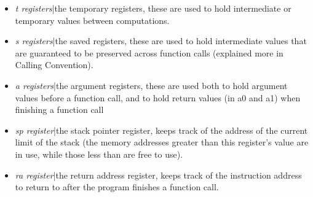 \documentclass{article}
\begin{document}
\begin{itemize}
\item \textit{t registers}|the temporary registers, these are used to hold intermediate or temporary values between computations.
\item \textit{s registers}|the saved registers, these are used to hold intermediate values that are guaranteed to be preserved across function calls (explained more in Calling Convention).
\item \textit{a registers}|the argument registers, these are used both to hold argument values before a function call, and to hold return values (in a0 and a1) when finishing a function call
\item \textit{sp register}|the stack pointer register, keeps track of the address of the current limit of the stack (the memory addresses greater than this register's value are in use, while those less than are free to use).
\item \textit{ra register}|the return address register, keeps track of the instruction address to return to after the program finishes a function call.
\end{itemize}
\end{document}
